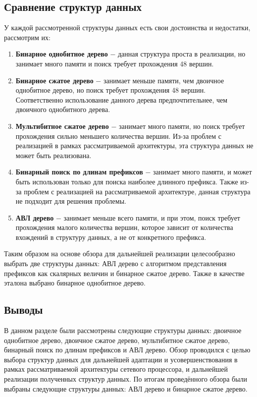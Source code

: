 \documentclass[conference]{IEEEtran}
\begin{document}
    \subsection{Сравнение структур данных}
        У каждой рассмотренной структуры данных есть свои достоинства и недостатки, рассмотрим их:
        \begin{enumerate}
            \item \textbf{Бинарное однобитное дерево} $-$ данная структура проста в реализации, но занимает много памяти и поиск требует прохождения 48 вершин.
            \item \textbf{Бинарное сжатое дерево} $-$ занимает меньше памяти, чем двоичное однобитное дерево, но поиск требует прохождения 48 вершин. 
                Соответственно использование данного дерева предпочтительнее, чем двоичного однобитного дерева.
            \item \textbf{Мультибитное сжатое дерево} $-$ занимает много памяти, но поиск требует прохождения сильно меньшего количества вершин. 
                Из-за проблем с реализацией в рамках рассматриваемой архитектуры, эта структура данных не может быть реализована.
            \item \textbf{Бинарный поиск по длинам префиксов} $-$ занимает много памяти, и может быть использован только для поиска наиболее длинного префикса.
                Также из-за проблем с реализацией на рассматриваемой архитектуре, данная структура не подходит для решения проблемы.
            \item \textbf{АВЛ дерево} $-$ занимает меньше всего памяти, и при этом, поиск требует прохождения малого количества вершин,
                которое зависит от количества вхождений в структуру данных, а не от конкретного префикса.
        \end{enumerate}

        Таким образом на основе обзора для дальнейшей реализации целесообразно выбрать две структуры данных: 
        АВЛ дерево с алгоритмом представления префиксов как скалярных величин и бинарное сжатое дерево. 
        Также в качестве эталона выбрано бинарное однобитное дерево.
    \subsection{Выводы}
        В данном разделе были рассмотрены следующие структуры данных: двоичное однобитное дерево, двоичное сжатое дерево, мультибитное сжатое дерево, бинарный поиск по длинам префиксов и АВЛ дерево.
        Обзор проводился с целью выбора структур данных для дальнейшей адаптации и усовершенствования в рамках рассматриваемой архитектуры сетевого процессора, 
        и дальнейшей реализации полученных структур данных. По итогам проведённого обзора были выбраны следующие структуры данных: АВЛ дерево и бинарное сжатое дерево.
\end{document}
